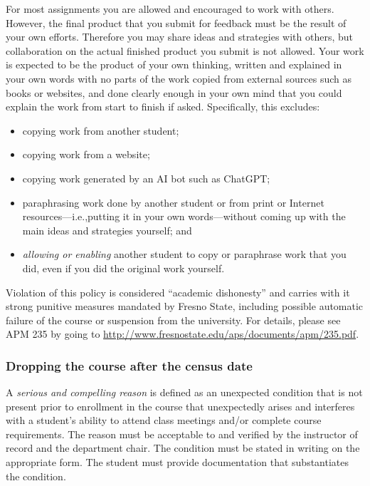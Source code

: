 For most assignments you are allowed and encouraged to work with others.
However, the final product that you submit for feedback must be the
result of your own efforts. Therefore you may share ideas and strategies
with others, but collaboration on the actual finished product you submit
is not allowed. Your work is expected to be the product of your own
thinking, written and explained in your own words with no parts of the
work copied from external sources such as books or websites, and done
clearly enough in your own mind that you could explain the work from
start to finish if asked. Specifically, this excludes:

\begin{itemize}
\tightlist
\item
  copying work from another student;
\item
  copying work from a website;
\item
  copying work generated by an AI bot such as ChatGPT;
\item
  paraphrasing work done by another student or from print or Internet
  resources---i.e.,putting it in your own words---without coming up with
  the main ideas and strategies yourself; and
\item
  \emph{allowing or enabling} another student to copy or paraphrase work
  that you did, even if you did the original work yourself.
\end{itemize}

Violation of this policy is considered ``academic dishonesty'' and
carries with it strong punitive measures mandated by Fresno State,
including possible automatic failure of the course or suspension from
the university. For details, please see APM 235 by going to
\url{http://www.fresnostate.edu/aps/documents/apm/235.pdf}.

\subsubsection{Dropping the course after the census
date}\label{dropping-the-course-after-the-census-date}

A \emph{serious and compelling reason} is defined as an unexpected
condition that is not present prior to enrollment in the course that
unexpectedly arises and interferes with a student's ability to attend
class meetings and/or complete course requirements. The reason must be
acceptable to and verified by the instructor of record and the
department chair. The condition must be stated in writing on the
appropriate form. The student must provide documentation that
substantiates the condition.

